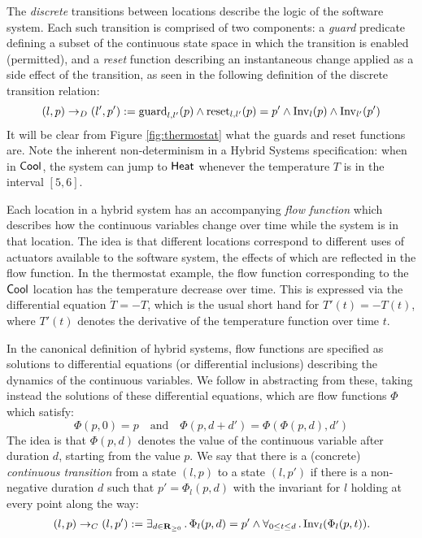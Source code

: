 \documentclass[runningheads]{llncs}
\newcommand{\Exists}[2]{\exists_{#1} \, . \, #2}
\newcommand{\Forall}[2]{\forall_{#1} \, . \, #2}
\newcommand{\IR}{{\mathbf R}}
\newcommand{\Heat}{{\sf Heat}}
\newcommand{\Cool}{{\sf Cool}}
\newcommand{\Inv}{{\rm Inv}}
\newcommand{\guard}{{\rm guard}}
\newcommand{\reset}{{\rm reset}}
\newcommand{\contrans}{\rightarrow_C}
\newcommand{\distrans}{\rightarrow_D}
\newcommand{\Dur}{{\IR_{\geq 0}}}
\begin{document}

The \emph{discrete} transitions between locations describe the
logic of the software system. Each such transition is comprised of two
components: a \emph{guard} predicate defining a subset of the continuous state
space in which the transition is enabled (permitted), and a \emph{reset} function
describing an
instantaneous change applied as a side effect of the transition, as
seen in the following definition of the discrete transition relation:
$$ (l,p) \distrans (l',p') := \guard_{l,l'}(p) \wedge
\reset_{l,l'}(p)= p' \wedge \Inv_l(p) \wedge \Inv_{l'}(p')$$ It will
be clear from Figure \ref{fig:thermostat} what the guards and reset
functions are. Note the inherent non-determinism in a Hybrid Systems
specification: when in $\Cool$, the system can jump to $\Heat$
whenever the temperature $T$ is in the interval $[5,6]$.


Each location in a hybrid system has an accompanying \emph{flow function} which describes how the continuous variables change over
time while the system is in that location. The idea is that different locations correspond to different uses of actuators
available to the software system, the effects of which are reflected in the flow function. In the thermostat example, the flow
function corresponding to the $\Cool$ location has the
temperature decrease over time. 
This is expressed via the differential equation $\dot{T} = - T$,
which is the usual short hand for $T'(t) = - T(t)$, where $T'(t)$
denotes the derivative of the temperature function over time $t$.

In the canonical definition of hybrid systems, flow functions are
specified as solutions to differential equations (or differential
inclusions) describing the dynamics of the continuous variables. We
follow \cite{alur} in abstracting from these, taking instead the
solutions of these differential equations, which are flow functions
$\Phi$ which satisfy:
$$\Phi(p, 0) = p \quad \mbox{and} \quad \Phi (p, d + d') = \Phi
(\Phi(p, d), d')$$ 
The idea is that $\Phi(p,d)$ denotes the value of the
continuous variable after duration $d$, starting from the value
$p$. We say that there is a (concrete) \emph{continuous
  transition} from a state $(l, p)$ to a state $(l, p')$ if there is a
non-negative duration $d$ such that $p' = \Phi_l(p,d)$ with the
invariant for $l$ holding at every point along the way:
$$ (l,p) \contrans (l,p') := \Exists{d\in
\Dur}{\Phi_l(p, d) = p' \wedge \Forall{0 \leq t\leq d}{\Inv_l(\Phi_l (p, t))}}.$$
\end{document}

